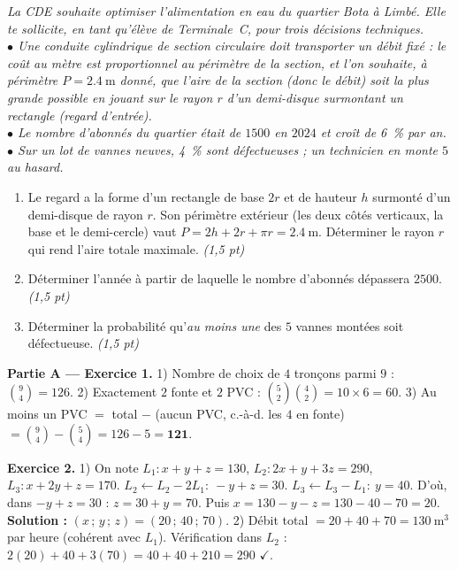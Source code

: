 \noindent\textit{La CDE souhaite optimiser l'alimentation en eau du quartier Bota à Limbé.
Elle te sollicite, en tant qu'élève de Terminale~C, pour trois décisions techniques.\\
$\bullet$ Une conduite cylindrique de section circulaire doit transporter un débit fixé : le coût
au mètre est proportionnel au périmètre de la section, et l'on souhaite, à \emph{périmètre}
$P=\SI{2,4}{\metre}$ donné, que l'aire de la section (donc le débit) soit la plus grande possible
en jouant sur le rayon $r$ d'un demi-disque surmontant un rectangle (regard d'entrée).\\
$\bullet$ Le nombre d'abonnés du quartier était de $1500$ en $2024$ et croît de \SI{6}{\percent} par an.\\
$\bullet$ Sur un lot de vannes neuves, \SI{4}{\percent} sont défectueuses ; un technicien en monte $5$ au hasard.}

\begin{enumerate}[label=\textbf{Tâche \arabic*.},leftmargin=2.4em]
\item Le regard a la forme d'un rectangle de base $2r$ et de hauteur $h$ surmonté d'un demi-disque
de rayon $r$. Son périmètre extérieur (les deux côtés verticaux, la base et le demi-cercle) vaut
$P=2h+2r+\pi r=\SI{2,4}{\metre}$. Déterminer le rayon $r$ qui rend l'aire totale maximale. \hfill\textit{(1,5 pt)}
\item Déterminer l'année à partir de laquelle le nombre d'abonnés dépassera $2500$. \hfill\textit{(1,5 pt)}
\item Déterminer la probabilité qu'\emph{au moins une} des $5$ vannes montées soit défectueuse. \hfill\textit{(1,5 pt)}
\end{enumerate}
\par{}


\noindent\textbf{Partie A — Exercice 1.}
1) Nombre de choix de $4$ tronçons parmi $9$ : $\binom{9}{4}=126$.
2) Exactement $2$ fonte et $2$ PVC : $\binom{5}{2}\binom{4}{2}=10\times6=60$.
3) Au moins un PVC $=$ total $-$ (aucun PVC, c.-à-d. les $4$ en fonte) $=\binom94-\binom54=126-5=\mathbf{121}$.

\noindent\textbf{Exercice 2.}
1) On note $L_1:x+y+z=130$, $L_2:2x+y+3z=290$, $L_3:x+2y+z=170$.
$L_2\leftarrow L_2-2L_1:\ -y+z=30$. $L_3\leftarrow L_3-L_1:\ y=40$.
D'où, dans $-y+z=30$ : $z=30+y=70$. Puis $x=130-y-z=130-40-70=20$.
\textbf{Solution :} $(x\,;\,y\,;\,z)=(20\,;\,40\,;\,70)$.
2) Débit total $=20+40+70=\SI{130}{\cubic\metre}$ par heure (cohérent avec $L_1$).
Vérification dans $L_2$ : $2(20)+40+3(70)=40+40+210=290$ $\checkmark$.

